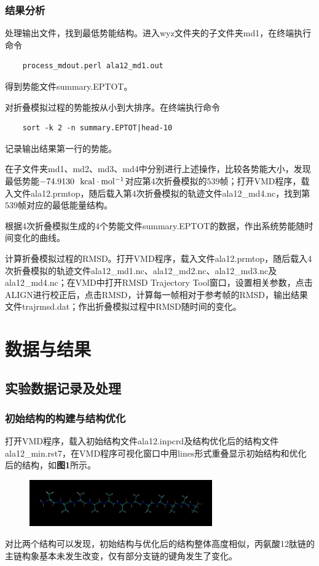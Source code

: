 \documentclass[12pt]{article}
\begin{document}
			\subsubsection{结果分析}
处理输出文件，找到最低势能结构。进入wyz文件夹的子文件夹md1，在终端执行命令
\begin{lstlisting}
	process_mdout.perl ala12_md1.out
\end{lstlisting}
得到势能文件summary.EPTOT。\par
对折叠模拟过程的势能按从小到大排序。在终端执行命令
\begin{lstlisting}
	sort -k 2 -n summary.EPTOT|head-10
\end{lstlisting}
记录输出结果第一行的势能。\par
在子文件夹md1、md2、md3、md4中分别进行上述操作，比较各势能大小，发现最低势能$-74.9130\ \ \rm kcal \cdot mol^{-1}$对应第4次折叠模拟的$539$帧；打开VMD程序，载入文件ala12.prmtop，随后载入第4次折叠模拟的轨迹文件ala12\_md4.nc，找到第$539$帧对应的最低能量结构。\par
根据4次折叠模拟生成的4个势能文件summary.EPTOT的数据，作出系统势能随时间变化的曲线。\par
计算折叠模拟过程的RMSD。打开VMD程序，载入文件ala12.prmtop，随后载入4次折叠模拟的轨迹文件ala12\_md1.nc、ala12\_md2.nc、ala12\_md3.nc及ala12\_md4.nc；在VMD中打开RMSD Trajectory Tool窗口，设置相关参数，点击ALIGN进行校正后，点击RMSD，计算每一帧相对于参考帧的RMSD，输出结果文件trajrmsd.dat；作出折叠模拟过程中RMSD随时间的变化。
\vbox{}  
	 \section{数据与结果}
 		\subsection{实验数据记录及处理}
 		            \subsubsection{初始结构的构建与结构优化}
打开VMD程序，载入初始结构文件ala12.inpcrd及结构优化后的结构文件ala12\_min.rst7，在VMD程序可视化窗口中用lines形式重叠显示初始结构和优化后的结构，如\textbf{图1}所示。
 		 \begin{figure}[h]
 			\centering
 			\includegraphics[width=0.7\textwidth]{1.png}
 		\end{figure}
\par
对比两个结构可以发现，初始结构与优化后的结构整体高度相似，丙氨酸12肽链的主链构象基本未发生改变，仅有部分支链的键角发生了变化。
 	
\end{document}
